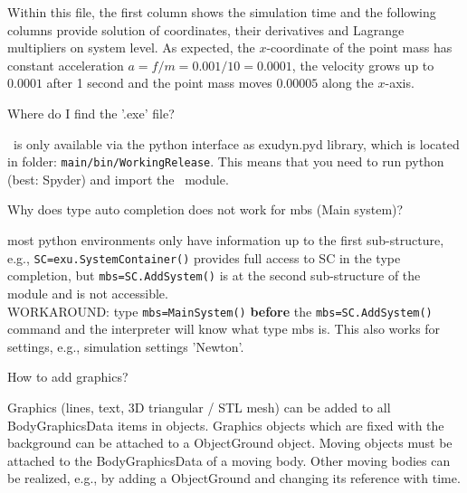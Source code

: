 Within this file, the first column shows the simulation time and the following columns provide solution of coordinates, their derivatives and Lagrange multipliers on system level. As expected, the $x$-coordinate of the point mass has constant acceleration $a=f/m=0.001/10=0.0001$, the velocity grows up to $0.0001$ after 1 second and the point mass moves $0.00005$ along the $x$-axis.
%

\bn
  \item Where do I find the '.exe' file?
	\bi
	\item[$\ra$] \codeName\ is only available via the python interface as exudyn.pyd library, which is located in folder: \texttt{main/bin/WorkingRelease}. This means that you need to run python (best: Spyder) and import the \codeName\ module.
	\ei
	\item Why does type auto completion does not work for mbs (Main system)?
	\bi
	\item[$\ra$] most python environments only have information up to the first sub-structure, e.g., \texttt{SC=exu.SystemContainer()} provides full access to SC in the type completion, but \texttt{mbs=SC.AddSystem()} is at the second sub-structure of the module and is not accessible.\\
	WORKAROUND: type \texttt{mbs=MainSystem()} {\bf before} the \texttt{mbs=SC.AddSystem()} command and the interpreter will know what type mbs is. This also works for settings, e.g., simulation settings 'Newton'.
	\ei
  \item How to add graphics?
	\bi
	\item[$\ra$] Graphics (lines, text, 3D triangular / STL mesh) can be added to all BodyGraphicsData items in objects. Graphics objects which are fixed with the background can be attached to a ObjectGround object.
	Moving objects must be attached to the BodyGraphicsData of a moving body. Other moving bodies can be realized, e.g., by adding a ObjectGround and changing its reference with time.
